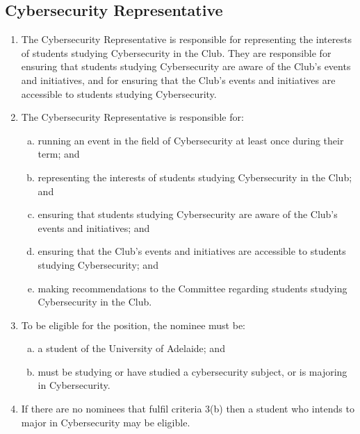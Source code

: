 \documentclass{schedule}
\begin{document}
\subsection{Cybersecurity Representative}
\begin{enumerate}[(1)]
    \item The Cybersecurity Representative is responsible for representing the interests of students studying Cybersecurity in the Club. They are responsible for ensuring that students studying Cybersecurity are aware of the Club's events and initiatives, and for ensuring that the Club's events and initiatives are accessible to students studying Cybersecurity.
    \item The Cybersecurity Representative is responsible for:
          \begin{enumerate}[(a)]
              \item running an event in the field of Cybersecurity at least once during their term; and
              \item representing the interests of students studying Cybersecurity in the Club; and
              \item ensuring that students studying Cybersecurity are aware of the Club's events and initiatives; and
              \item ensuring that the Club's events and initiatives are accessible to students studying Cybersecurity; and
              \item making recommendations to the Committee regarding students studying Cybersecurity in the Club.
          \end{enumerate}
    \item To be eligible for the position, the nominee must be:
          \begin{enumerate}[(a)]
              \item a student of the University of Adelaide; and
              \item must be studying or have studied a cybersecurity subject, or is majoring in Cybersecurity.
          \end{enumerate}
    \item If there are no nominees that fulfil criteria 3(b) then a student who intends to major in Cybersecurity may be eligible.
\end{enumerate}
\end{document}

